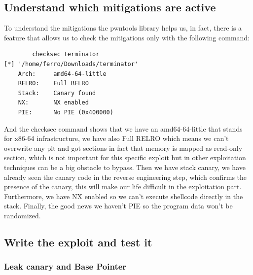     \clearpage
    \subsection{Understand which mitigations are active}
    To understand the mitigations the pwntools library helps us, in fact, there is a feature that allows us to check the mitigations only with the following command:
    \begin{verbatim}
        checksec terminator                                     
[*] '/home/ferro/Downloads/terminator'
    Arch:     amd64-64-little
    RELRO:    Full RELRO
    Stack:    Canary found
    NX:       NX enabled
    PIE:      No PIE (0x400000)
    \end{verbatim}
    And the checksec command shows that we have an amd64-64-little that stands for x86-64 infrastructure, we have also Full RELRO which means we can't overwrite any plt and got sections in fact that memory is mapped as read-only section, which is not important for this specific exploit but in other exploitation techniques can be a big obstacle to bypass.\newline
    Then we have stack canary, we have already seen the canary code in the reverse engineering step, which confirms the presence of the canary, this will make our life difficult in the exploitation part.\newline
    Furthermore, we have NX enabled so we can't execute shellcode directly in the stack.\newline
    Finally, the good news we haven't PIE so the program data won't be randomized.\newline
    \subsection{Write the exploit and test it}
    \subsubsection{Leak canary and Base Pointer}

